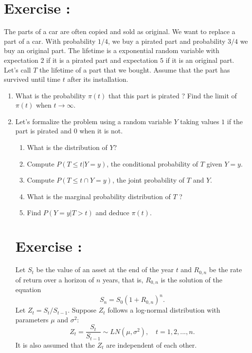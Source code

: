 \documentclass[12pt,thmsa]{article}
\begin{document}
\addtocounter{section}{1}
\section*{Exercise \thesection:}

The parts of a car are often copied and sold as original. We want to replace a part of a car.
With probability $1/4$, we buy a pirated part and probability $3/4$ we buy
an original part. The lifetime is a exponential random variable with expectation $2$ if it
is a pirated part and expectation $5$ if it is an original part.
Let's call $T$ the lifetime of a part that we bought.
Assume that the part has survived until time $t$ after its installation.
\begin{enumerate}
  \item What is the probability $\pi(t)$ that this part is pirated ?
Find the limit of $\pi(t)$ when $t \rightarrow \infty$.
\item Let's formalize the problem using a random variable $Y$ taking values $1$ if the part is pirated and $0$ when it is not.
\begin{enumerate}
  \item What is the distribution of $Y$?
  \item Compute $P(T \leq t \vert Y=y)$, the conditional probability of $T$ given $Y=y$.
  \item Compute $P(T \leq t \cap Y=y)$, the joint probability of $T$ and $Y$.
  \item What is the marginal probability distribution of $T$ ?
  \item Find $P(Y=y \vert T>t)$ and deduce $\pi(t)$.
\end{enumerate}



\addtocounter{section}{1}
\section*{Exercise \thesection:}

Let $S_t$ be the value of an asset at the end of the year $t$ and $R_{0,n}$ be the rate of return over a horizon of $n$ years, that is, $R_{0,n}$
is the solution of the equation
\begin{equation*}
S_n=S_0(1+R_{0,n})^n .
\end{equation*}
Let $Z_t={S_t}/S_{t-1}$. Suppose $Z_t$ follows a log-normal distribution with parameters $\mu$ and $\sigma^2$: %
$$
Z_t=\frac{S_t}{S_{t-1}} \sim LN(\mu, \sigma^2), \quad t=1,2,...,n.
$$
It is also assumed that the $Z_t$ are independent of each other.
\medskip


\end{enumerate}
\end{document}
